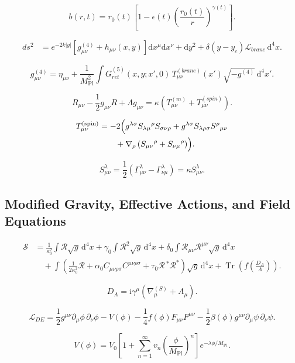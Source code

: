 \documentclass[11pt,a4paper]{article}
\newcommand{\R}{\mathcal{R}}
\newcommand{\Lag}{\mathcal{L}}
\newcommand{\Tr}{\operatorname{Tr}}
\newcommand{\dd}{\mathrm{d}}
\newcommand{\ii}{\mathrm{i}}
\begin{document}
\[
b(r,t)=r_0(t)\left[1-\epsilon(t)\left(\frac{r_0(t)}{r}\right)^{\gamma(t)}\right].
\]

\begin{align*}
ds^2
&=e^{-2k|y|}\left[g^{(4)}_{\mu\nu}+h_{\mu\nu}(x,y)\right]\dd x^\mu\dd x^\nu
  +\dd y^2+\delta(y-y_c)\Lag_{brane}\,\dd^4x .
\end{align*}

\[
g^{(4)}_{\mu\nu}
=\eta_{\mu\nu}+\frac{1}{M_{\mathrm{Pl}}^2}
\int G^{(5)}_{ret}(x,y;x',0)\,
T^{(brane)}_{\mu\nu}(x')\sqrt{-g^{(4)}}\,\dd^4x'.
\]

\[
R_{\mu\nu}-\frac12 g_{\mu\nu}R+\Lambda g_{\mu\nu}
=\kappa\left(T^{(m)}_{\mu\nu}+T^{(spin)}_{\mu\nu}\right).
\]

\begin{align*}
T^{(\mathrm{spin})}_{\mu\nu}
&=-2\Bigl(g^{\lambda\sigma}S_{\lambda\mu}{}^{\rho}S_{\sigma\nu\rho}
  +g^{\lambda\sigma}S_{\lambda\rho\sigma}S^{\rho}{}_{\mu\nu}\\
&\qquad+\nabla_\rho\left(S_{\mu\nu}{}^{\rho}+S_{\nu\mu}{}^{\rho}\right)\Bigr).
\end{align*}

\[
S_{\mu\nu}^{\lambda}
=\frac12\left(\Gamma_{\mu\nu}^{\lambda}-\Gamma_{\nu\mu}^{\lambda}\right)
=\kappa S_{\mu\nu}^{\lambda}.
\]

\subsection{Modified Gravity, Effective Actions, and Field Equations}

\begin{align*}
\mathcal{S}
&=\frac{1}{\kappa_0^2}\int \R\sqrt{g}\,\dd^4x
 +\gamma_0\int \R^2\sqrt{g}\,\dd^4x
 +\delta_0\int \R_{\mu\nu}\R^{\mu\nu}\sqrt{g}\,\dd^4x\\
&\quad+\int\left(\frac{1}{2\kappa_0^2}\R
 +\alpha_0 C_{\mu\nu\rho\sigma}C^{\mu\nu\rho\sigma}
 +\tau_0 \R\,{}^{*}\R^{*}\right)\sqrt{g}\,\dd^4x
 +\Tr\left(f\left(\frac{D_A}{\Lambda}\right)\right).
\end{align*}

\[
D_A=\ii\gamma^\mu\left(\nabla_\mu^{(S)}+A_\mu\right).
\]

\[
\Lag_{DE}
=\frac12 g^{\mu\nu}\partial_\mu\phi\,\partial_\nu\phi-V(\phi)
-\frac14 f(\phi)F_{\mu\nu}F^{\mu\nu}
-\frac12\beta(\phi)g^{\mu\nu}\partial_\mu\psi\,\partial_\nu\psi .
\]

\[
V(\phi)=V_0\left[1+\sum_{n=1}^{\infty}v_n
\left(\frac{\phi}{M_{\mathrm{Pl}}}\right)^n\right]
e^{-\lambda\phi/M_{\mathrm{Pl}}}.
\]
\end{document}
